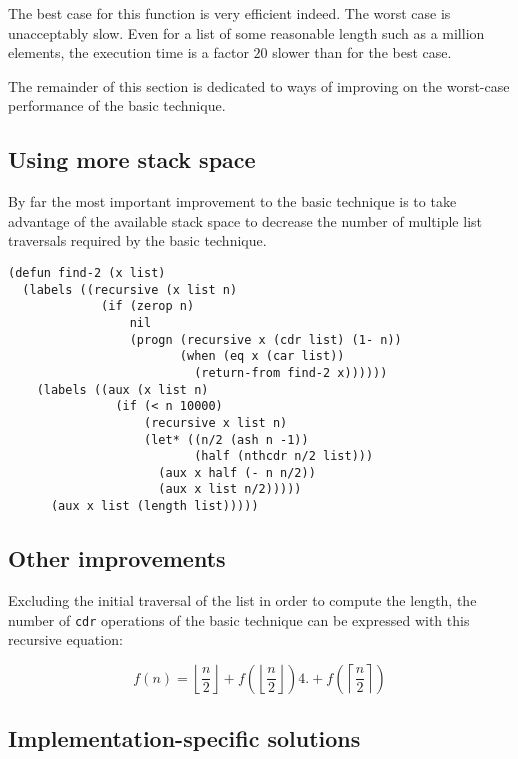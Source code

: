 The best case for this function is very efficient indeed.%
The worst case is unacceptably slow.  Even for a list of some
reasonable length such as a million elements, the execution time is a
factor $20$ slower than for the best case.

The remainder of this section is dedicated to ways of improving on the
worst-case performance of the basic technique.

\subsection{Using more stack space}

By far the most important improvement to the basic technique is to
take advantage of the available stack space to decrease the number of
multiple list traversals required by the basic technique.


{\small\begin{verbatim}
(defun find-2 (x list)
  (labels ((recursive (x list n)
             (if (zerop n)
                 nil
                 (progn (recursive x (cdr list) (1- n))
                        (when (eq x (car list))
                          (return-from find-2 x))))))
    (labels ((aux (x list n)
               (if (< n 10000)
                   (recursive x list n)
                   (let* ((n/2 (ash n -1))
                          (half (nthcdr n/2 list)))
                     (aux x half (- n n/2))
                     (aux x list n/2)))))
      (aux x list (length list)))))
\end{verbatim}}

\subsection{Other improvements}

Excluding the initial traversal of the list in order to compute the
length, the number of \texttt{cdr} operations of the basic technique
can be expressed with this recursive equation:%

$$f(n) = \left\lfloor\frac{n}{2}\right\rfloor
+ f(\left\lfloor\frac{n}{2}\right\rfloor)4.
+ f(\left\lceil\frac{n}{2}\right\rceil)$$

\subsection{Implementation-specific solutions}

